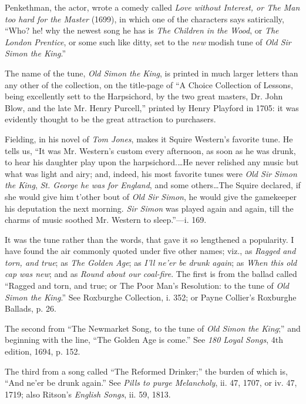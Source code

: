 Penkethman, the actor, wrote a comedy called \textit{Love without Interest, or
The Man too hard for the Master} (1699), in which one of the characters says
satirically, “Who? he! why the newest song he has is \textit{The Children in the Wood},
or \textit{The London Prentice}, or some such like ditty, set to the \textit{new} modish tune of
\textit{Old Sir Simon the King}.”

The name of the tune, \textit{Old Simon the King}, is printed in much larger letters
than any other of the collection, on the title-page of “A Choice Collection of
Lessons, being excellently sett to the Harpsichord, by the two great masters,
Dr. John Blow, and the late Mr. Henry Purcell,” printed by Henry Playford in
1705: it was evidently thought to be the great attraction to purchasers.

Fielding, in his novel of \textit{Tom Jones}, makes it Squire Western’s favorite tune.
He tells us, “It was Mr. Western’s custom every afternoon, as soon as he was
drunk, to hear his daughter play upon the harpsichord.\ldots He never relished
any music but what was light and airy; and, indeed, his most favorite tunes were
\textit{Old Sir Simon the King}, \textit{St. George he was for England}, and some others\dots The
Squire declared, if she would give him t’other bout of \textit{Old Sir Simon}, he would
give the gamekeeper his deputation the next morning. \textit{Sir Simon} was played
again and again, till the charms of music soothed Mr. Western to sleep.”—i. 169.

It was the tune rather than the words, that gave it so lengthened a popularity.
I have found the air commonly quoted under \pagebreak five other names; viz., as \textit{Ragged}
\textit{and torn, and true}; as \textit{The Golden Age}; as \textit{I’ll ne’er be drunk again}; as \textit{When
this old cap was new}; and as \textit{Round about our coal-fire}. The first is from the
ballad called “Ragged and torn, and true; or The Poor Man’s Resolution: to
the tune of \textit{Old Simon the King}.” See Roxburghe Collection, i. 352; or Payne
Collier’s Roxburghe Ballads, p. 26.

The second from “The Newmarket Song, to the tune of \textit{Old Simon the King};”
and beginning with the line, “The Golden Age is come.” See \textit{180 Loyal Songs},
4th edition, 1694, p. 152.

The third from a song called “The Reformed Drinker;” the burden of which
is, “And ne’er be drunk again.” See \textit{ Pills to purge Melancholy}, ii. 47, 1707, or
iv. 47, 1719; also Ritson’s \textit{English Songs}, ii. 59, 1813.

